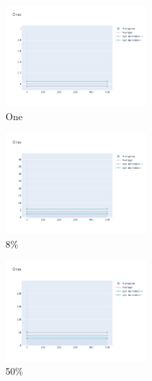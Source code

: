 \documentclass[12pt, fleqn]{report}                             %
\theoremstyle{break}                                            %
\begin{document}
      \begin{figure}[ht!]
        \centering
        \begin{subfigure}[b]{0.4\linewidth}
          \includegraphics[width=0.6\textwidth]{Images/104/dia-a.png}
          \caption{One}
        \end{subfigure}
        \begin{subfigure}[b]{0.4\linewidth}
          \includegraphics[width=0.6\textwidth]{Images/104/dia-b.png}
          \caption{8\%}
        \end{subfigure}
        \begin{subfigure}[b]{0.4\linewidth}
          \includegraphics[width=0.6\textwidth]{Images/104/dia-c.png}
          \caption{50\%}
        \end{subfigure}
        \begin{subfigure}[b]{0.4\linewidth}

\end{subfigure}
\end{figure}
\end{document}
